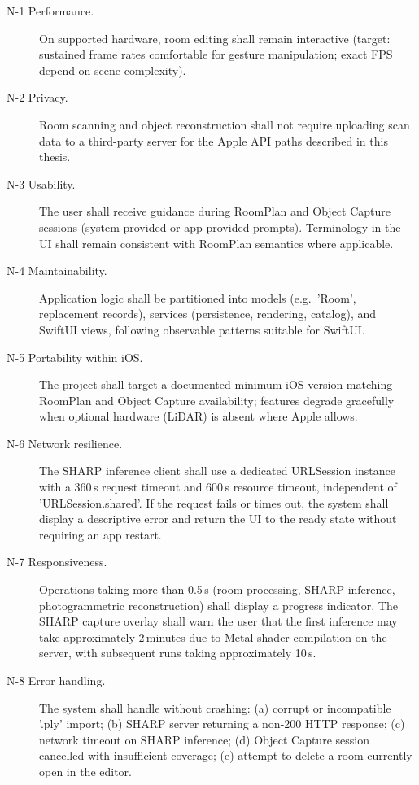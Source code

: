 \begin{description}
    \item[N-1 Performance.] On supported hardware, room editing shall remain interactive (target: sustained frame rates comfortable for gesture manipulation; exact FPS depend on scene complexity).

    \item[N-2 Privacy.] Room scanning and object reconstruction shall not require uploading scan data to a third-party server for the Apple API paths described in this thesis.

    \item[N-3 Usability.] The user shall receive guidance during RoomPlan and Object Capture sessions (system-provided or app-provided prompts). Terminology in the UI shall remain consistent with RoomPlan semantics where applicable.

    \item[N-4 Maintainability.] Application logic shall be partitioned into models (e.g.\ 'Room', replacement records), services (persistence, rendering, catalog), and SwiftUI views, following observable patterns suitable for SwiftUI.

    \item[N-5 Portability within iOS.] The project shall target a documented minimum iOS version matching RoomPlan and Object Capture availability; features degrade gracefully when optional hardware (LiDAR) is absent where Apple allows.

    \item [N-6 Network resilience.] The SHARP inference client shall use a dedicated URLSession instance with a 360\,s request timeout and 600\,s resource timeout, independent of 'URLSession.shared'. If the request fails or times out, the system shall display a descriptive error and return the UI to the ready state without requiring an app restart.

    \item [N-7 Responsiveness.] Operations taking more than 0.5\,s (room processing, SHARP inference, photogrammetric reconstruction) shall display a progress indicator. The SHARP capture overlay shall warn the user that the first inference may take approximately 2\,minutes due to Metal shader compilation on the server, with subsequent runs taking approximately 10\,s.

    \item [N-8 Error handling.] The system shall handle without crashing: (a) corrupt or incompatible '.ply' import; (b) SHARP server returning a non-200 HTTP response; (c) network timeout on SHARP inference; (d) Object Capture session cancelled with insufficient coverage; (e) attempt to delete a room currently open in the editor.

\end{description}

